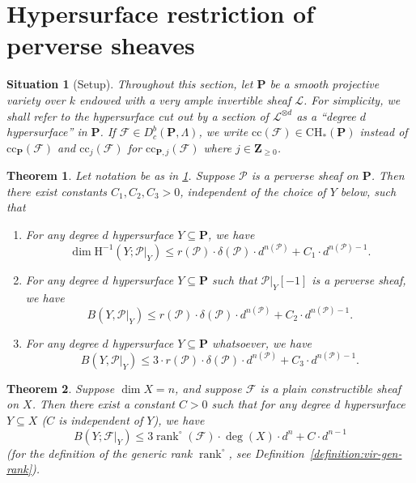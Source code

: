\documentclass[10pt,a4paper]{amsart}
\newtheorem{situation}{Situation}
\newtheorem{theorem}{Theorem}
\renewcommand{\geq}{\geqslant}
\renewcommand{\leq}{\leqslant}
\renewcommand{\mathbb}{\mathbf}
\renewcommand{\subset}{\subseteq}
\begin{document}
\section{Hypersurface restriction of perverse sheaves }
\label{sec:main-theorem}
\begin{situation}[Setup]\label{setup}
Throughout this section, let \(\mathbb{P}\) be a smooth projective
variety over \(k\) endowed with a very ample invertible sheaf
\(\mathscr{L}\).  For simplicity, we shall refer to the hypersurface
cut out by a section of \(\mathscr{L}^{\otimes d}\) as a ``degree
\(d\) hypersurface'' in \(\mathbb{P}\).  If
\(\mathcal{F} \in D^b_c(\mathbb{P},\Lambda)\), we write
\(\mathrm{cc}(\mathcal{F}) \in \mathrm{CH}_{\ast}(\mathbb{P})\)
instead of \(\mathrm{cc}_{\mathbb{P}}(\mathcal{F})\) and \(\mathrm{cc}_j(\mathcal{F})\) for \(\mathrm{cc}_{\mathbb{P},j}(\mathcal{F})\) where \(j \in \mathbb{Z}_{\geq0}\).
\end{situation}

\begin{theorem}\label{theorem:main}
Let notation be as in \ref{setup}.  Suppose \(\mathcal{P}\) is a
perverse sheaf on \(\mathbb{P}\).  Then there exist constants
\(C_1, C_2, C_3 > 0\), independent of the choice of \(Y\) below, such
that
\begin{enumerate}
\item For any degree \(d\) hypersurface \(Y \subset \mathbb{P}\),
we have
\[
\dim \mathrm{H}^{-1}(Y;\mathcal{P}|_Y) \leq r(\mathcal{P}) \cdot \delta(\mathcal{P}) \cdot d^{n(\mathcal{P})} +
C_1 \cdot d^{n(\mathcal{P})-1}.
\]
\item For any degree \(d\) hypersurface \(Y \subset \mathbb{P}\) such
that \(\mathcal{P}|_Y[-1]\) is a perverse sheaf, we have
\[
B(Y, \mathcal{P}|_{Y}) \leq r(\mathcal{P}) \cdot \delta(\mathcal{P}) \cdot d^{n(\mathcal{P})} + C_2 \cdot d^{n(\mathcal{P})-1}.
\]
\item For any degree \(d\) hypersurface \(Y \subset \mathbb{P}\) whatsoever, we
have
\[
B(Y, \mathcal{P}|_{Y}) \leq 3\cdot r(\mathcal{P}) \cdot \delta(\mathcal{P}) \cdot d^{n(\mathcal{P})} + C_3 \cdot d^{n(\mathcal{P})-1}.
\]
\end{enumerate}
\end{theorem}

\begin{theorem}\label{theorem:arbitrary}
Suppose \(\dim X = n\), and suppose \(\mathcal{F}\) is
a plain constructible sheaf on \(X\).  Then there exist a constant \(C> 0\) such
that for any degree \(d\) hypersurface \(Y \subset X\) (\(C\) is
independent of \(Y\)), we have
\[
B(Y;\mathcal{F}|_{Y}) \leq 3 \operatorname{rank}^{\circ}(\mathcal{F}) \cdot \deg(X) \cdot d^n + C \cdot d^{n-1}
\]
(for the definition of the generic rank
\(\operatorname{rank}^{\circ}\), see
Definition~\ref{definition:vir-gen-rank}).
\end{theorem}
\end{document}
